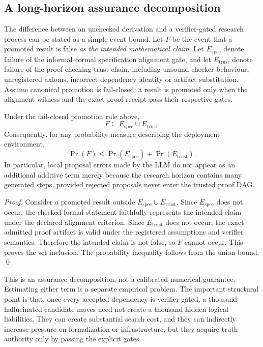 
\subsection{A long-horizon assurance decomposition}

The difference between an unchecked derivation and a verifier-gated research process can be stated as a simple event bound. Let $F$ be the event that a promoted result is false \emph{as the intended mathematical claim}. Let $E_{\mathrm{spec}}$ denote failure of the informal--formal specification alignment gate, and let $E_{\mathrm{trust}}$ denote failure of the proof-checking trust chain, including unsound checker behaviour, unregistered axioms, incorrect dependency identity or artifact substitution. Assume canonical promotion is fail-closed: a result is promoted only when the alignment witness and the exact proof receipt pass their respective gates.

\begin{proposition}
Under the fail-closed promotion rule above,
\[
F\subseteq E_{\mathrm{spec}}\cup E_{\mathrm{trust}}.
\]
Consequently, for any probability measure describing the deployment environment,
\[
\Pr(F)\leq
\Pr(E_{\mathrm{spec}})+\Pr(E_{\mathrm{trust}}).
\]
In particular, local proposal errors made by the LLM do not appear as an additional additive term merely because the research horizon contains many generated steps, provided rejected proposals never enter the trusted proof DAG.
\end{proposition}

\begin{proof}
Consider a promoted result outside $E_{\mathrm{spec}}\cup E_{\mathrm{trust}}$. Since $E_{\mathrm{spec}}$ does not occur, the checked formal statement faithfully represents the intended claim under the declared alignment criterion. Since $E_{\mathrm{trust}}$ does not occur, the exact admitted proof artifact is valid under the registered assumptions and verifier semantics. Therefore the intended claim is not false, so $F$ cannot occur. This proves the set inclusion. The probability inequality follows from the union bound. \qed
\end{proof}

\begin{remark}
This is an assurance decomposition, not a calibrated numerical guarantee. Estimating either term is a separate empirical problem. The important structural point is that, once every accepted dependency is verifier-gated, a thousand hallucinated candidate moves need not create a thousand hidden logical liabilities. They can create substantial search cost, and they can indirectly increase pressure on formalization or infrastructure, but they acquire truth authority only by passing the explicit gates.
\end{remark}

